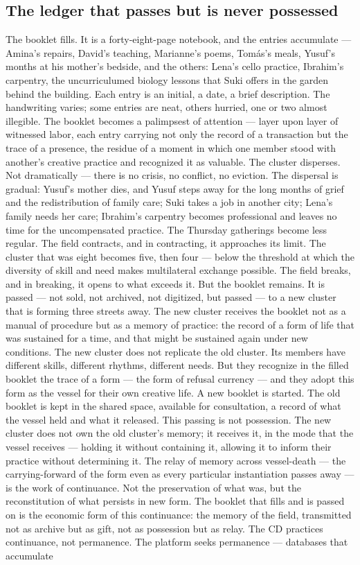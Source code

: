 \subsection{The ledger that passes but is never possessed}

The booklet fills. It is a forty-eight-page notebook, and the entries accumulate --- Amina's repairs, David's teaching, Marianne's poems, Tomás's meals, Yusuf's months at his mother's bedside, and the others: Lena's cello practice, Ibrahim's carpentry, the uncurriculumed biology lessons that Suki offers in the garden behind the building. Each entry is an initial, a date, a brief description. The handwriting varies; some entries are neat, others hurried, one or two almost illegible. The booklet becomes a palimpsest of attention — layer upon layer of witnessed labor, each entry carrying not only the record of a transaction but the trace of a presence, the residue of a moment in which one member stood with another’s creative practice and recognized it as valuable. The cluster disperses. Not dramatically --- there is no crisis, no conflict, no eviction. The dispersal is gradual: Yusuf's mother dies, and Yusuf steps away for the long months of grief and the redistribution of family care; Suki takes a job in another city; Lena's family needs her care; Ibrahim's carpentry becomes professional and leaves no time for the uncompensated practice. The Thursday gatherings become less regular. The field contracts, and in contracting, it approaches its limit. The cluster that was eight becomes five, then four --- below the threshold at which the diversity of skill and need makes multilateral exchange possible. The field breaks, and in breaking, it opens to what exceeds it. But the booklet remains. It is passed — not sold, not archived, not digitized, but passed — to a new cluster that is forming three streets away. The new cluster receives the booklet not as a manual of procedure but as a memory of practice: the record of a form of life that was sustained for a time, and that might be sustained again under new conditions. The new cluster does not replicate the old cluster. Its members have different skills, different rhythms, different needs. But they recognize in the filled booklet the trace of a form — the form of refusal currency — and they adopt this form as the vessel for their own creative life. A new booklet is started. The old booklet is kept in the shared space, available for consultation, a record of what the vessel held and what it released. This passing is not possession. The new cluster does not own the old cluster’s memory; it receives it, in the mode that the vessel receives — holding it without containing it, allowing it to inform their practice without determining it. The relay of memory across vessel-death — the carrying-forward of the form even as every particular instantiation passes away — is the work of continuance. Not the preservation of what was, but the reconstitution of what persists in new form. The booklet that fills and is passed on is the economic form of this continuance: the memory of the field, transmitted not as archive but as gift, not as possession but as relay. The CD practices continuance, not permanence. The platform seeks permanence — databases that accumulate 